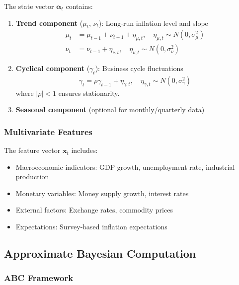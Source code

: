 The state vector $\boldsymbol{\alpha}_t$ contains:

\begin{enumerate}
    \item \textbf{Trend component} ($\mu_t$, $\nu_t$): Long-run inflation level and slope
    \begin{align}
        \mu_t &= \mu_{t-1} + \nu_{t-1} + \eta_{\mu,t}, \quad \eta_{\mu,t} \sim N(0, \sigma^2_\mu)\\
        \nu_t &= \nu_{t-1} + \eta_{\nu,t}, \quad \eta_{\nu,t} \sim N(0, \sigma^2_\nu)
    \end{align}
    
    \item \textbf{Cyclical component} ($\gamma_t$): Business cycle fluctuations
    \begin{align}
        \gamma_t = \rho \gamma_{t-1} + \eta_{\gamma,t}, \quad \eta_{\gamma,t} \sim N(0, \sigma^2_\gamma)
    \end{align}
    where $|\rho| < 1$ ensures stationarity.
    
    \item \textbf{Seasonal component} (optional for monthly/quarterly data)
\end{enumerate}

\subsubsection{Multivariate Features}

The feature vector $\mathbf{x}_t$ includes:
\begin{itemize}
    \item Macroeconomic indicators: GDP growth, unemployment rate, industrial production
    \item Monetary variables: Money supply growth, interest rates
    \item External factors: Exchange rates, commodity prices
    \item Expectations: Survey-based inflation expectations
\end{itemize}

\subsection{Approximate Bayesian Computation}

\subsubsection{ABC Framework}

